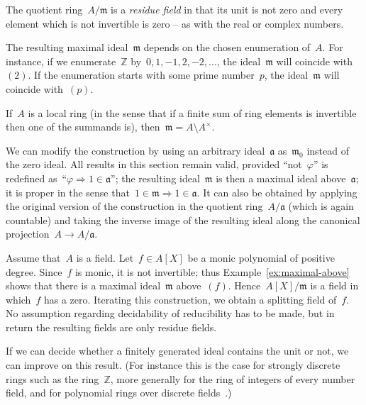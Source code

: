 \documentclass[envcountsect,envcountsame,runningheads]{llncs}
\newcommand{\aaa}{\mathfrak{a}}
\newcommand{\mmm}{\mathfrak{m}}
\newcommand{\ZZ}{\mathbb{Z}}
\renewcommand{\_}{\mathpunct{.}\,}
\begin{document}
The quotient ring~$A/\mmm$ is a \emph{residue field} in that its unit is not
zero and every element which is not invertible is zero -- as with the real or
complex numbers.

\begin{example}The resulting maximal ideal~$\mmm$ depends on the chosen enumeration
of~$A$. For instance, if we enumerate~$\ZZ$ by~$0,1,-1,2,-2,\ldots$, the
ideal~$\mmm$ will coincide with~$(2)$. If the enumeration starts with some
prime number~$p$, the ideal~$\mmm$ will coincide with~$(p)$.\end{example}

\begin{example}If~$A$ is a local ring (in the sense that if a finite sum of ring
elements is invertible then one of the summands is), then~$\mmm = A \setminus
A^\times$.\end{example}

\begin{example}\label{ex:maximal-above}We can modify the construction by using an
arbitrary ideal~$\aaa$ as~$\mmm_0$ instead of the zero ideal. All results in
this section remain valid, provided ``not~$\varphi$'' is redefined
as~``$\varphi \Rightarrow 1\in\aaa$''; the resulting ideal~$\mmm$ is then a
maximal ideal above~$\aaa$; it is proper in the sense that~$1 \in \mmm
\Rightarrow 1 \in \aaa$. It can also be obtained by applying the original
version of the construction in the quotient ring~$A/\aaa$ (which is again
countable) and taking the inverse image of the resulting ideal along the
canonical projection~$A \to A/\aaa$.\end{example}

\begin{example}Assume that~$A$ is a field. Let~$f \in A[X]$ be a monic
polynomial of positive degree. Since~$f$ is monic, it is not invertible; thus
Example~\ref{ex:maximal-above} shows that there is a maximal ideal~$\mmm$
above~$(f)$. Hence~$A[X]/\mmm$ is a field in which~$f$ has a zero.
Iterating this construction, we obtain a splitting field of~$f$. No
assumption regarding decidability of reducibility has to be made, but in return
the resulting fields are only residue fields.\end{example}

If we can decide whether a finitely generated ideal contains the
unit or not, we can improve on this result. (For instance this is the case for
strongly discrete rings such as the ring~$\ZZ$, more generally for the ring of
integers of every number field, and for polynomial rings over discrete
fields~\cite[Theorem~VIII.1.5]{mines-richman-ruitenburg:constructive-algebra}.)
\end{document}
